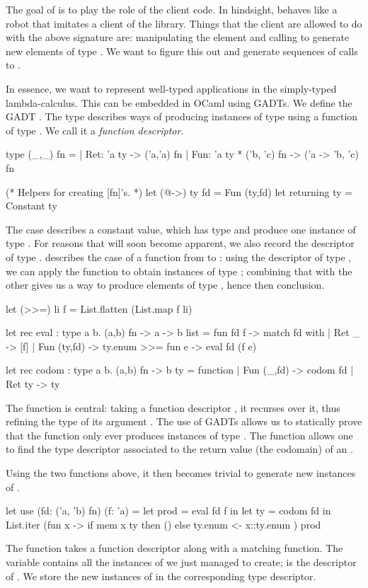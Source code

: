 The goal of \arti is to play the role of the client code. In hindsight, \arti
behaves like a robot that imitates a client of the library. Things that the
client are allowed to do with the above signature are: manipulating the
 element and calling  to generate new elements of type
. We want \arti to figure this out and generate sequences of calls to
.

In essence, we want to represent well-typed applications in the
simply-typed lambda-calculus. This can be embedded in OCaml using GADTs. We
define the GADT . The type describes ways of producing
instances of type  using a function of type . We call it a
\emph{function descriptor}.
%
\begin{ocamlcode}
type (_,_) fn =
| Ret: 'a ty -> ('a,'a) fn
| Fun: 'a ty * ('b, 'c) fn -> ('a -> 'b, 'c) fn

(* Helpers for creating [fn]'s. *)
let (@->) ty fd = Fun (ty,fd)
let returning ty = Constant ty
\end{ocamlcode}
%
The  case describes a constant value, which has type  and
produce one instance of type . For reasons that will soon become
apparent, we also record the descriptor of type .  describes
the case of a function from  to : using the descriptor of type
, we can apply the function to obtain instances of type ;
combining that with the other  gives us a way to produce
elements of type , hence then  conclusion.
%
\begin{ocamlcode}
let (>>=) li f = List.flatten (List.map f li)

let rec eval : type a b. (a,b) fn -> a -> b list =
  fun fd f ->
    match fd with
    | Ret _ -> [f]
    | Fun (ty,fd) ->
        ty.enum >>= fun e -> eval fd (f e)

let rec codom : type a b. (a,b) fn -> b ty =
  function
    | Fun (_,fd) -> codom fd
    | Ret ty -> ty
\end{ocamlcode}
%
The  function is central: taking a function descriptor , it
recurses over it, thus refining the type of its argument . The use of
GADTs allows us to statically prove that the  function only ever
produces instances of type .
%
The  function allows one to find the type
descriptor associated to the return value (the codomain) of an .

Using the two functions above, it then becomes trivial to generate new instances
of .
%
\begin{ocamlcode}
let use (fd: ('a, 'b) fn) (f: 'a) =
  let prod = eval fd f in
  let ty = codom fd in
  List.iter (fun x -> 
    if mem x ty then () else ty.enum <- x::ty.enum
  ) prod
\end{ocamlcode}
%
The function takes a function descriptor along with a matching function. The
 variable contains all the instances of  we just managed to
create;  is the descriptor of . We store the new
instances of  in the corresponding type descriptor.


